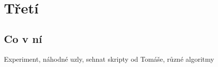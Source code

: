 
\chapter{Třetí}

\section{Co v ní}
Experiment, náhodné uzly, sehnat skripty od Tomáše, různé algoritmy


